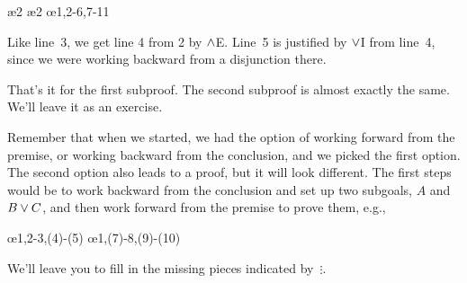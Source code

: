 \begin{fitchproof}
	\PR
	\open
	\AS
	\ae{2}
	\ae{2}
	\close
	\open
	\AS
	\ellipsesline
	\close
	\oe{1,2-6,7-11}
\end{fitchproof}
Like line~3, we get line 4 from 2 by $\wedge$E. Line~5 is justified by $\vee$I from line~4, since we were working backward from a disjunction there.

That's it for the first subproof. The second subproof is almost exactly the same. We'll leave it as an exercise.

Remember that when we started, we had the option of working forward from the premise, or working backward from the conclusion, and we picked the first option. The second option also leads to a proof, but it will look different.  The first steps would be to work backward from the conclusion and set up two subgoals, $A$ and $B \vee C$, and then work forward from the premise to prove them, e.g.,
\begin{fitchproof}
	\PR
	\open
	\AS
	\ellipsesline
	\close
	\open
	\AS
	\ellipsesline
	\close
	\oe{1,2-3,(4)-(5)}
	\open
	\AS
	\ellipsesline
	\close
	\open
	\AS
	\ellipsesline
	\close
	\oe{1,(7)-8,(9)-(10)}	
\end{fitchproof}
We'll leave you to fill in the missing pieces indicated by~$\vdots$.

